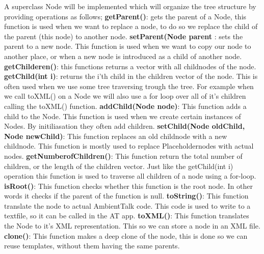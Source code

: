 \documentclass[a4paper,12pt]{report}
\begin{document}
A superclass Node will be implemented which will organize the tree structure by providing operations as follows;
\newline\textbf{getParent()}: gets the parent of a Node, this function is used when we want to replace a node, to do so we replace the child of the parent (this node) to another node.
\newline\textbf{setParent(Node parent} : sets the parent to a new node. This function is used when we want to copy our node to another place, or when a new node is introduced as a child of another node.
\newline\textbf{getChilderen()}:  this functions returns a vector with all childnodes of the node. 
\newline\textbf{getChild(int i)}: returns the i'th child in the children vector of the node. This is often used when we use some tree traversing trough the tree. For example when we call toXML() on a Node we will also 
use a for loop over all of it's children calling the toXML() function.
\newline\textbf{addChild(Node node)}: This function adds a child to the Node. This function is used when we create certain instances of Nodes. By initiliasation they often add children.
\newline\textbf{setChild(Node oldChild, Node newChild)}: This function replaces an old childnode with a new childnode. This function is mostly used to replace Placeholdernodes with actual nodes.
\newline\textbf{getNumberofChildren()}: This function return the total number of children, or the length of the children vector. Just like the getChild(int i) operation this function is used to traverse all children of a node
using a for-loop.
\newline\textbf{isRoot()}: This function checks whether this function is the root node. In other words it checks if the parent of the function is null.
\newline\textbf{toString()}: This function translate the node to actual AmbientTalk code. This code is used to write to a textfile, so it can be called in the AT app.
\newline\textbf{toXML()}: This function translates the Node to it's XML representation. This so we can store a node in an XML file.
\newline\textbf{clone()}: This function makes a deep clone of the node, this is done so we can reuse templates, without them having the same parents.
\newline
\end{document}
